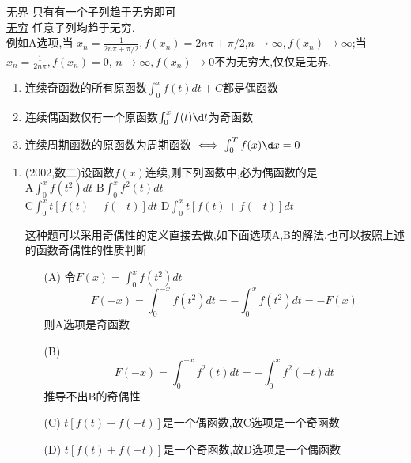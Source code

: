 \documentclass[12pt, a4paper, oneside, UTF8]{ctexbook}
\begin{document}
\begin{corollary}[无穷VS无界]
    \underline{无界} 只有有一个子列趋于无穷即可 \\
    \underline{无穷} 任意子列均趋于无穷.  \\
    例如A选项,当 $x_n=\frac{1}{2n\pi+\pi/2},f(x_n)=2n\pi+\pi/2$,$n\to\infty,f(x_n)\to\infty$;当
    $x_n=\frac{1}{2n\pi},f(x_n)=0$, $n\to\infty,f(x_n)\to 0$不为无穷大,仅仅是无界.
\end{corollary}

\begin{remark}[导函数与原函数的奇偶性与周期性]
    \begin{enumerate}
    \item 连续奇函数的所有原函数$\int_{0}^{x}f(t)dt+C$都是偶函数 

    \item 连续偶函数仅有一个原函数$\int_{0}^{x}f(t)\d t$为奇函数
    
    \item 连续周期函数的原函数为周期函数 $\iff\int_{0}^{T}f(x)\d x=0$
    \end{enumerate}
\end{remark}

\begin{enumerate}[label=\arabic*.,start=2]
    \item  (2002,数二)设函数$f(x)$连续,则下列函数中,必为偶函数的是 \\
    A\quad $\int_0^x f(t^2) dt$ \qquad\qquad
    B\quad $\int_0^x f^2(t) dt$ \\
    C\quad $\int_0^x t[f(t)-f(-t)] dt$ \qquad
    D\quad $\int_0^x t[f(t)+f(-t)] dt$

    
    \begin{solution}
    这种题可以采用奇偶性的定义直接去做,如下面选项A,B的解法,也可以按照上述的函数奇偶性的性质判断
    \begin{enumerate}
    \item [(A)] 令$F(x) = \int_0^x f(t^2) dt$
    \[
    F(-x)=\int_0^{-x} f(t^2) dt=-\int_0^x f(t^2) dt=-F(x)
    \]
    则A选项是奇函数
    \item [(B)] 
    \[
    F(-x)=\int_0^{-x} f^2(t) dt = -\int_0^x f^2(-t) dt
    \]
    推导不出B的奇偶性
    \item [(C)] $t[f(t)-f(-t)]$是一个偶函数,故C选项是一个奇函数
    \item [(D)] $t[f(t)+f(-t)]$是一个奇函数,故D选项是一个偶函数
    \end{enumerate}
    \end{solution}
\end{enumerate}
\end{document}
